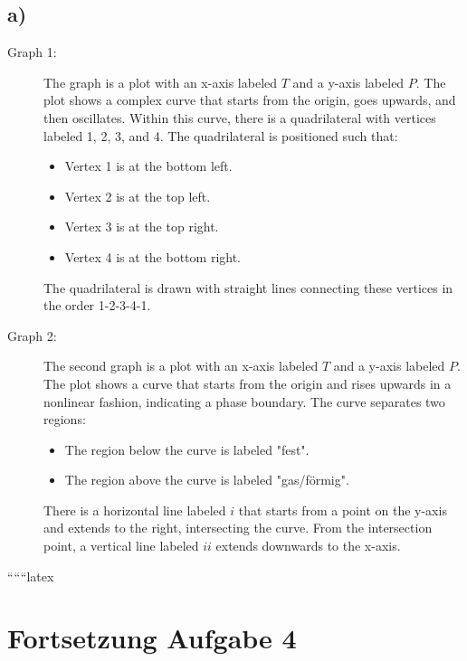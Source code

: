 

\subsection*{a)}

\begin{description}
    \item[Graph 1:] 
    The graph is a plot with an x-axis labeled \( T \) and a y-axis labeled \( P \). The plot shows a complex curve that starts from the origin, goes upwards, and then oscillates. Within this curve, there is a quadrilateral with vertices labeled 1, 2, 3, and 4. The quadrilateral is positioned such that:
    \begin{itemize}
        \item Vertex 1 is at the bottom left.
        \item Vertex 2 is at the top left.
        \item Vertex 3 is at the top right.
        \item Vertex 4 is at the bottom right.
    \end{itemize}
    The quadrilateral is drawn with straight lines connecting these vertices in the order 1-2-3-4-1.
    
    \item[Graph 2:]
    The second graph is a plot with an x-axis labeled \( T \) and a y-axis labeled \( P \). The plot shows a curve that starts from the origin and rises upwards in a nonlinear fashion, indicating a phase boundary. The curve separates two regions:
    \begin{itemize}
        \item The region below the curve is labeled "fest".
        \item The region above the curve is labeled "gas/förmig".
    \end{itemize}
    There is a horizontal line labeled \( i \) that starts from a point on the y-axis and extends to the right, intersecting the curve. From the intersection point, a vertical line labeled \( ii \) extends downwards to the x-axis.
\end{description}

``````latex

\section*{Fortsetzung Aufgabe 4}